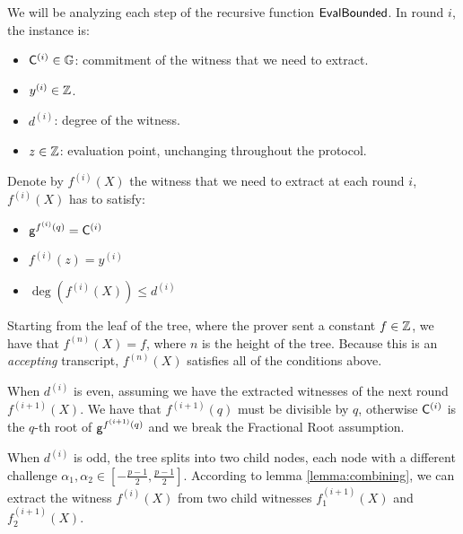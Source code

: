 We will be analyzing each step of the recursive function $\mathsf{EvalBounded}$. In round $i$, the instance is:
\begin{itemize}
    \item $\mathsf{C}^{(i)} \in \mathbb{G}$: commitment of the witness that we need to extract.
    \item $y^{(i)} \in \mathbb{Z}$.
    \item $d^{(i)}$: degree of the witness.
    \item $z \in \mathbb{Z}$: evaluation point, unchanging throughout the protocol.
\end{itemize}

Denote by $f^{(i)}(X)$ the witness that we need to extract at each round $i$, $f^{(i)}(X)$ has to satisfy:
\begin{itemize}
    \item $\mathsf{g}^{f^{(i)}(q)} = \mathsf{C}^{(i)}$
    \item $f^{(i)}(z) = y^{(i)}$
    \item $\deg(f^{(i)}(X)) \le d^{(i)}$
\end{itemize}

Starting from the leaf of the tree, where the prover sent a constant $f \in \mathbb{Z}$, we have that $f^{(n)}(X) = f$, where $n$ is the height of the tree. Because this is an \textit{accepting} transcript, $f^{(n)}(X)$ satisfies all of the conditions above.

When $d^{(i)}$ is even, assuming we have the extracted witnesses of the next round $f^{(i+1)}(X)$. We have that $f^{(i+1)}(q)$ must be divisible by $q$, otherwise $\mathsf{C}^{(i)}$ is the $q$-th root of $\mathsf{g}^{f^{(i+1)}(q)}$ and we break the Fractional Root assumption.

When $d^{(i)}$ is odd, the tree splits into two child nodes, each node with a different challenge $\alpha_1, \alpha_2 \in [-\frac{p-1}{2}, \frac{p-1}{2}]$. According to lemma \ref{lemma:combining}, we can extract the witness $f^{(i)}(X)$ from two child witnesses $f^{(i+1)}_1(X)$ and $f^{(i+1)}_2(X)$.

